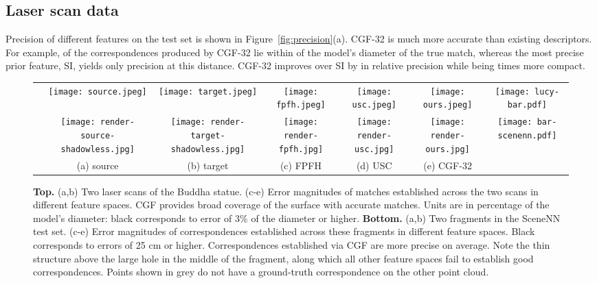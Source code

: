 \subsection{Laser scan data}
\label{sec:synthetic}

Precision of different features on the test set is shown in Figure~\ref{fig:precision}(a). CGF-32 is much more accurate than existing descriptors. For example,  of the correspondences produced by CGF-32 lie within  of the model's diameter of the true match, whereas the most precise prior feature, SI, yields only  precision at this distance. CGF-32 improves over SI by  in relative precision while being  times more compact.

\begin{figure*}[!t]
\centering
\begin{minipage}{0.97\textwidth}
\centering
\begin{tabular}{c c c c c c c}
    \raisebox{8mm}{\rot{Laser scans}} &
    \texttt{[image: source.jpeg]} &
    \texttt{[image: target.jpeg]} &
    \texttt{[image: fpfh.jpeg]} &
    \texttt{[image: usc.jpeg]} &
    \texttt{[image: ours.jpeg]} &
    \texttt{[image: lucy-bar.pdf]}\\
    \raisebox{8mm}{\rot{SceneNN}} &
    \texttt{[image: render-source-shadowless.jpg]} &
    \texttt{[image: render-target-shadowless.jpg]} &
    \texttt{[image: render-fpfh.jpg]} &
    \texttt{[image: render-usc.jpg]} &
    \texttt{[image: render-ours.jpg]} &
    \texttt{[image: bar-scenenn.pdf]}\\
    & \small{(a) source} & \small{(b) target} & \small{(c) FPFH} & \small{(d) USC} & \small{(e) CGF-32}\\
\end{tabular}
\end{minipage}\hfill
\vspace{1mm}
\caption{{\bf Top.} (a,b) Two laser scans of the Buddha statue. (c-e) Error magnitudes of matches established across the two scans in different feature spaces. CGF provides broad coverage of the surface with accurate matches. Units are in percentage of the model's diameter: black corresponds to error of 3\% of the diameter or higher.
{\bf Bottom.} (a,b) Two fragments in the SceneNN test set. (c-e) Error magnitudes of correspondences established across these fragments in different feature spaces. Black corresponds to errors of 25 cm or higher. Correspondences established via CGF are more precise on average. Note the thin structure above the large hole in the middle of the fragment, along which all other feature spaces fail to establish good correspondences.
Points shown in grey do not have a ground-truth correspondence on the other point cloud.
}
\label{fig:vis-error}
\vspace{-1mm}
\end{figure*}


